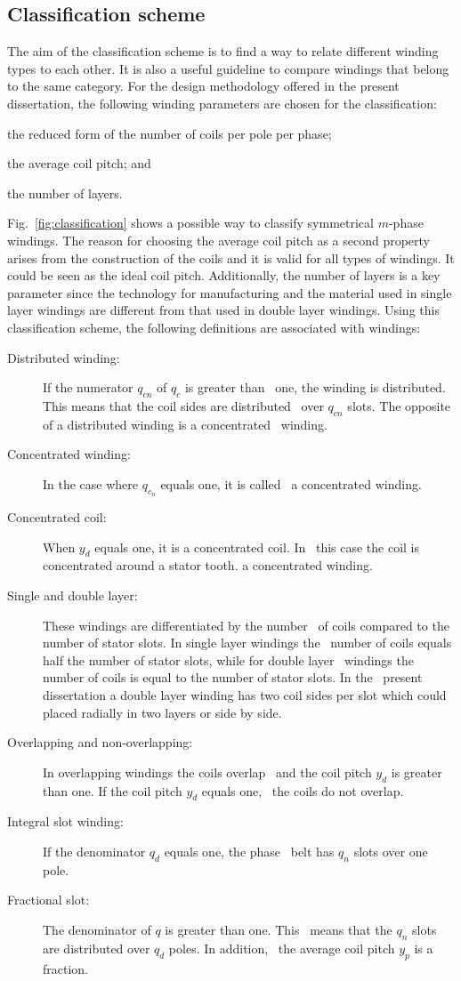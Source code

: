 \subsection{Classification scheme}
The aim of the classification scheme is to find a way to relate different winding types to each other. It is also a useful guideline to compare windings that belong to the same category. For the design methodology offered in the present dissertation, the following winding parameters are chosen for the classification:
\begin{enumerate*}
	\item the reduced form of the number of coils per pole per phase;
	\item the average coil pitch; and 
	\item the number of layers.
\end{enumerate*}
Fig.~\ref{fig:classification} shows a possible way to classify symmetrical $m$-phase windings. The reason for choosing the average coil pitch as a second property arises from the construction of the coils and it is valid for all types of windings. It could be seen as the ideal coil pitch. Additionally, the number of layers is a key parameter since the technology for manufacturing and the material used in single layer windings are different from that used in double layer windings. Using this classification scheme, the following definitions are associated with windings:
\begin{description}
	\item[Distributed winding:] If the numerator $q_{cn}$ of $q_c$ is greater than~%
	one, the winding is distributed. This means that the coil sides are distributed~%
	over $q_{cn}$ slots. The opposite of a distributed winding is a concentrated~%
	winding.
	\item[Concentrated winding:] In the case where $q_{c_n}$ equals one, it is called~%
	a concentrated winding. 
	\item[Concentrated coil:] When $y_d$ equals one, it is a concentrated coil. In~%
	this case the coil is concentrated around a stator tooth.
	a concentrated winding. 
	\item[Single and double layer:] These windings are differentiated by the number~%
	of coils compared to the number of stator slots. In single layer windings the~%
	number of coils equals half the number of stator slots, while for double layer~%
	windings the number of coils is equal to the number of stator slots. In the~%
	present dissertation a double layer winding has two coil sides per slot which could~%
	placed radially in two layers or side by side. 
	\item[Overlapping and non-overlapping:] In overlapping windings the coils overlap~%
	and the coil pitch $y_d$ is greater than one. If the coil pitch $y_d$ equals one,~%
	the coils do not overlap.
	\item[Integral slot winding:] If the denominator $q_d$ equals one, the phase~%
	belt has $q_n$ slots over one pole.
	\item[Fractional slot:] The denominator of $q$ is greater than one. This~%
	means that the $q_n$ slots are distributed over $q_d$ poles. In addition,~%
	the average coil pitch $y_p$ is a fraction. 
\end{description}

